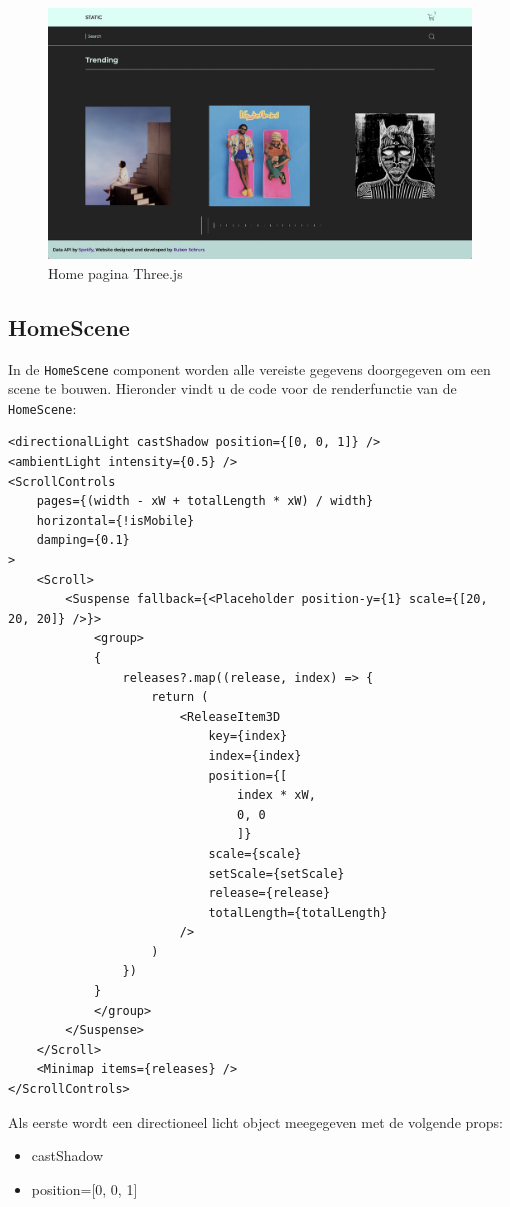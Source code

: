 \begin{figure}[h]
	\centering
	\includegraphics[width=1\linewidth]{graphics/desktopHomeThree}
	\caption[Home pagina Three.js]{Home pagina Three.js}
	\label{fig:desktopHomeThree}
\end{figure}

\newpage
\subsection{HomeScene}

In de \texttt{HomeScene} component worden alle vereiste gegevens doorgegeven om een scene te bouwen. Hieronder vindt u de code voor de renderfunctie van de \texttt{HomeScene}:

\begin{lstlisting}
<directionalLight castShadow position={[0, 0, 1]} />
<ambientLight intensity={0.5} />
<ScrollControls
	pages={(width - xW + totalLength * xW) / width}
	horizontal={!isMobile}
	damping={0.1}
>
	<Scroll>
		<Suspense fallback={<Placeholder position-y={1} scale={[20, 20, 20]} />}>
			<group>
			{
				releases?.map((release, index) => {
					return (
						<ReleaseItem3D
							key={index}
							index={index}
							position={[
								index * xW,
								0, 0
								]}
							scale={scale}
							setScale={setScale}
							release={release}
							totalLength={totalLength}
						/>
					)
				})
			}
			</group>
		</Suspense>
	</Scroll>
	<Minimap items={releases} />
</ScrollControls>
\end{lstlisting}

Als eerste wordt een directioneel licht object meegegeven met de volgende props:

\begin{itemize}
	\item castShadow
	\item position={[0, 0, 1]}
\end{itemize}

